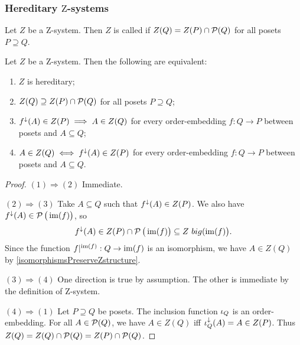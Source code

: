 \subsubsection{Hereditary $\mathrm{Z}$-systems}
\begin{definition}
Let $Z$ be a $\mathrm{Z}$-system. Then $Z$ is called  if $Z(Q) = Z(P)\cap \operatorname{\mathcal{P}}(Q)$ for all posets $P \supseteq Q$.
\end{definition}

\begin{lemma}
Let $Z$ be a $\mathrm{Z}$-system. Then the following are equivalent:
\begin{enumerate}
\item $Z$ is hereditary;
\item $Z(Q) \supseteq Z(P)\cap \operatorname{\mathcal{P}}(Q)$ for all posets $P \supseteq Q$;
\item $f^\downarrow(A) \in Z(P) \implies A \in Z(Q)$ for every order-embedding $f: Q\to P$ between posets and $A\subseteq Q$;
\item $A \in Z(Q) \iff f^\downarrow(A) \in Z(P)$ for every order-embedding $f: Q\to P$ between posets and $A\subseteq Q$.
\end{enumerate}
\end{lemma}
\begin{proof}
$(1) \Rightarrow (2)$ Immediate.

$(2) \Rightarrow (3)$ Take $A\subseteq Q$ such that $f^\downarrow(A) \in Z(P)$. We also have $f^\downarrow(A) \in \operatorname{\mathcal{P}}\big(\operatorname{im}(f)\big)$, so
\[ f^\downarrow(A) \in Z(P) \cap \operatorname{\mathcal{P}}\big(\operatorname{im}(f)\big) \subseteq Z\
big(\operatorname{im}(f)\big). \]
Since the function $f|^{\operatorname{im}(f)}: Q \to \operatorname{im}(f)$ is an isomorphism, we have $A\in Z(Q)$ by \ref{isomorphismsPreserveZstructure}.

$(3) \Rightarrow (4)$ One direction is true by assumption. The other is immediate by the definition of $\mathrm{Z}$-system.

$(4) \Rightarrow (1)$ Let $P\supseteq Q$ be posets. The inclusion function $\operatorname{\iota}_Q$ is an order-embedding. For all $A\in \operatorname{\mathcal{P}}(Q)$, we have $A\in Z(Q)$ iff $\operatorname{\iota}_Q^\downarrow(A) = A \in Z(P)$. Thus $Z(Q) = Z(Q) \cap \operatorname{\mathcal{P}}(Q) = Z(P) \cap \operatorname{\mathcal{P}}(Q)$.
\end{proof}

